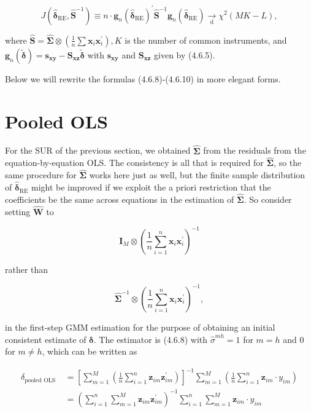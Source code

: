 \documentclass[10pt]{article}
\begin{document}
$$
J\left(\hat{\boldsymbol{\delta}}_{\mathrm{RE}}, \widehat{\mathbf{S}}^{-1}\right) \equiv n \cdot \mathbf{g}_{n}\left(\hat{\boldsymbol{\delta}}_{\mathrm{RE}}\right)^{\prime} \widehat{\mathbf{S}}^{-1} \mathbf{g}_{n}\left(\hat{\boldsymbol{\delta}}_{\mathrm{RE}}\right) \underset{\mathrm{d}}{\rightarrow} \chi^{2}(M K-L),
$$

where $\widehat{\mathbf{S}}=\widehat{\mathbf{\Sigma}} \otimes\left(\frac{1}{n} \sum \mathbf{x}_{i} \mathbf{x}_{i}^{\prime}\right), K$ is the number of common instruments, and $\mathbf{g}_{n}(\tilde{\boldsymbol{\delta}})=\mathbf{s}_{\mathbf{x y}}-\mathbf{S}_{\mathbf{x z}} \tilde{\boldsymbol{\delta}}$ with $\mathbf{s}_{\mathbf{x y}}$ and $\mathbf{S}_{\mathbf{x z}}$ given by (4.6.5).

Below we will rewrite the formulas (4.6.8)-(4.6.10) in more elegant forms.

\section*{Pooled OLS}
For the SUR of the previous section, we obtained $\widehat{\boldsymbol{\Sigma}}$ from the residuals from the equation-by-equation OLS. The consistency is all that is required for $\widehat{\mathbf{\Sigma}}$, so the same procedure for $\widehat{\boldsymbol{\Sigma}}$ works here just as well, but the finite sample distribution of $\hat{\boldsymbol{\delta}}_{\mathrm{RE}}$ might be improved if we exploit the a priori restriction that the coefficients be the same across equations in the estimation of $\widehat{\mathbf{\Sigma}}$. So consider setting $\widehat{\mathbf{W}}$ to

$$
\mathbf{I}_{M} \otimes\left(\frac{1}{n} \sum_{i=1}^{n} \mathbf{x}_{i} \mathbf{x}_{i}^{\prime}\right)^{-1}
$$

rather than

$$
\widehat{\mathbf{\Sigma}}^{-1} \otimes\left(\frac{1}{n} \sum_{i=1}^{n} \mathbf{x}_{i} \mathbf{x}_{i}^{\prime}\right)^{-1},
$$

in the first-step GMM estimation for the purpose of obtaining an initial consistent estimate of $\boldsymbol{\delta}$. The estimator is (4.6.8) with $\hat{\sigma}^{m h}=1$ for $m=h$ and 0 for $m \neq h$, which can be written as


\begin{align*}
\hat{\delta}_{\text {pooled OLS }} & =\left[\sum_{m=1}^{M}\left(\frac{1}{n} \sum_{i=1}^{n} \mathbf{z}_{i m} \mathbf{z}_{i m}^{\prime}\right)\right]^{-1} \sum_{m=1}^{M}\left(\frac{1}{n} \sum_{i=1}^{n} \mathbf{z}_{i m} \cdot y_{i m}\right) \\
& =\left(\sum_{i=1}^{n} \sum_{m=1}^{M} \mathbf{z}_{i m} \mathbf{z}_{i m}^{\prime}\right)^{-1} \sum_{i=1}^{n} \sum_{m=1}^{M} \mathbf{z}_{i m} \cdot y_{i m} \tag{4.6.11}
\end{align*}
\end{document}
